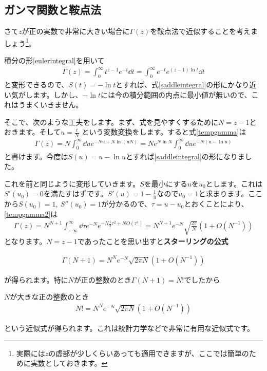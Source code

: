 \documentclass[report,paper=a4, fontsize=12pt, line_length=16cm, number_of_lines=33,dvipdfmx]{jlreq}
\newenvironment{important}{\begin{tcolorbox}[
  colback = white,
  colframe = red!35,
  boxrule = 2mm,
  fonttitle = \bfseries,
  after = \noindent] }{\end{tcolorbox}}
\numberwithin{equation}{section}
\newcommand{\strong}[1]{\textsf{\bfseries #1}}
\begin{document}
\subsection{ガンマ関数と鞍点法}
さて$z$が正の実数で非常に大きい場合に$\Gamma(z)$を鞍点法で近似することを考えましょう\footnote{実際には$z$の虚部が少しくらいあっても適用できますが、ここでは簡単のために実数としておきます。}。

積分の形\eqref{eulerintegral}を用いて
\begin{align}
  \Gamma(z)
  =\int_{0}^{\infty}t^{z-1}e^{-t}\dd{t}
  =\int_{0}^{\infty}e^{-t}e^{(z-1)\ln t}\dd{t}\label{tempgamma}
\end{align}
と変形できるので、$S(t)=-\ln t$とすれば、式\eqref{saddleintegral}の形にかなり近い気がします。しかし、$-\ln t$には今の積分範囲の内点に最小値が無いので、これはうまくいきません。

そこで、次のような工夫をします。まず、式を見やすくするために$N=z-1$とおきます。そして$u=\frac{t}{N}$ という変数変換をします。すると式\eqref{tempgamma}は
\begin{align}
  \Gamma(z)
  =N\int_{0}^{\infty}\dd{u}e^{-Nu+N\ln(uN)}
  =Ne^{N\ln N}\int_{0}^{\infty}\dd{u}e^{-N(u-\ln u)}\label{tempgamma2}
\end{align}
と書けます。今度は$S(u)=u-\ln u$とすれば\eqref{saddleintegral}の形になりました。

これを前と同じように変形していきます。$S$を最小にする$u$を$u_0$とします。これは$S'(u_0)=0$を満たすはずです。$S'(u)=1-\frac{1}{u}$なので$u_0=1$と求まります。ここから$S(u_0)=1,\ S''(u_0)=1$が分かるので、$\tau=u-u_0$とおくことにより、\eqref{tempgamma2}は
\begin{align}
  \Gamma(z)=N^{N+1}\int_{-\infty}^{\infty}\dd{\tau}e^{-N}e^{-N\frac12 \tau^2+NO(\tau^3)}=N^{N+1}e^{-N}\sqrt{\frac{2\pi}{N}}(1+O(N^{-1}))
\end{align}
となります。$N=z-1$であったことを思い出すと\strong{スターリングの公式}
\begin{important}
  \begin{align}
    \Gamma(N+1)=N^{N}e^{-N}\sqrt{2\pi N}(1+O(N^{-1}))\label{starling}
  \end{align}
\end{important}
が得られます。特に$N$が正の整数のとき$\Gamma(N+1)=N!$でしたから
\begin{important}
  $N$が大きな正の整数のとき
\begin{align}
  N!=N^{N}e^{-N}\sqrt{2\pi N}(1+O(N^{-1}))\label{starling2}
\end{align}
\end{important}
という近似式が得られます。これは統計力学などで非常に有用な近似式です。
\end{document}

